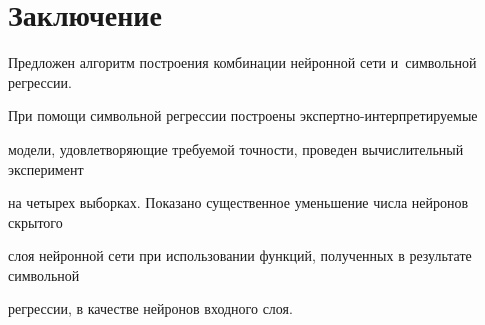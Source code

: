 \section{Заключение}



Предложен алгоритм построения комбинации нейронной сети и~символьной регрессии.

При помощи символьной регрессии построены экс\-перт\-но-ин\-тер\-пре\-ти\-ру\-емые 

модели, удовлетворяющие требуемой точности, проведен вычислительный эксперимент 

на четырех выборках. Показано существенное уменьшение числа нейронов скрытого 

слоя нейронной сети при использовании функций, полученных в результате символьной 

регрессии, в качестве нейронов входного слоя.



